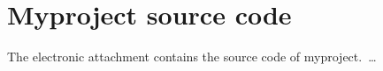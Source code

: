 \chapter{Myproject source code}\label{app:code}

The electronic attachment contains the source code of myproject.\ \ldots
